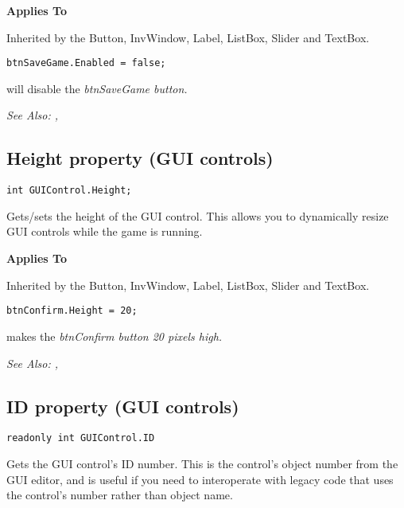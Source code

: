 \bf{Applies To}

Inherited by the Button, InvWindow, Label, ListBox, Slider and TextBox.

\begin{verbatim}
btnSaveGame.Enabled = false;
\end{verbatim}
will disable the \it{btnSaveGame} button.

\it{See Also:} ,


\subsection{Height property (GUI controls)}\label{GUIControl.Height}%

\begin{verbatim}
int GUIControl.Height;
\end{verbatim}
Gets/sets the height of the GUI control.  This allows you to dynamically
resize GUI controls while the game is running.

\bf{Applies To}

Inherited by the Button, InvWindow, Label, ListBox, Slider and TextBox.

\begin{verbatim}
btnConfirm.Height = 20;
\end{verbatim}
makes the \it{btnConfirm} button 20 pixels high.

\it{See Also:} ,


\subsection{ID property (GUI controls)}\label{GUIControl.ID}%

\begin{verbatim}
readonly int GUIControl.ID
\end{verbatim}
Gets the GUI control's ID number. This is the control's object number from the GUI editor,
and is useful if you need to interoperate with legacy code that uses the control's number
rather than object name.

